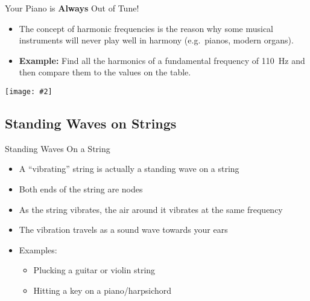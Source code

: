 \documentclass[12pt,compress,aspectratio=169]{beamer}
\newcommand{\pic}[2]{\texttt{[image: \#2]}}
\begin{document}
\begin{frame}{Your Piano is \textbf{Always} Out of Tune!}
  \begin{itemize}
  \item The concept of harmonic frequencies is the reason why some musical
    instruments will never play well in harmony (e.g.\ pianos, modern organs).
  \item \textbf{Example:} Find all the harmonics of a fundamental frequency of
    \SI{110}{\hertz} and then compare them to the values on the table.
  \end{itemize}
  \begin{center}
    \pic{.6}{fundamental_freqs.png}
  \end{center}
\end{frame}



\subsection[Strings]{Standing Waves on Strings}

\begin{frame}{Standing Waves On a String}
  \begin{itemize}
  \item A ``vibrating'' string is actually a standing wave on a string
  \item Both ends of the string are nodes
  \item As the string vibrates, the air around it vibrates at the same frequency
  \item The vibration travels as a sound wave towards your ears
  \item Examples:
    \begin{itemize}
    \item Plucking a guitar or violin string
    \item Hitting a key on a piano/harpsichord
    \end{itemize}
  \end{itemize}

\end{frame}
\end{document}
